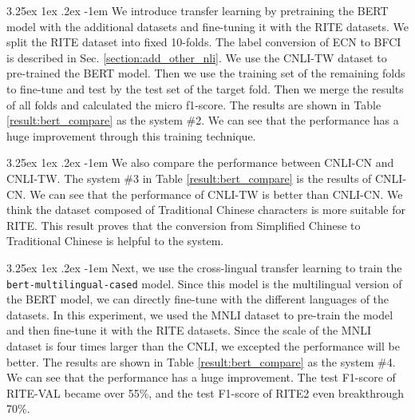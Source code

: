\documentclass[12pt]{article}
\makeatletter
\renewcommand\paragraph{\@startsection{paragraph}{5}{\z@}%
  {3.25ex \@plus1ex \@minus.2ex}%
  {-1em}%
  {\normalfont\normalsize\bfseries}}
\makeatother
\begin{document}
\begin{CJK*}{UTF8}{bkai}
\begin{spacing}{1.77}
\paragraph{}
We introduce transfer learning by pretraining the BERT model with the additional datasets and fine-tuning it with the RITE datasets. We split the RITE dataset into fixed 10-folds. The label conversion of ECN to BFCI is described in Sec. \ref{section:add_other_nli}. We use the CNLI-TW dataset to pre-trained the BERT model. Then we use the training set of the remaining folds to fine-tune and test by the test set of the target fold. Then we merge the results of all folds and calculated the micro f1-score. The results are shown in Table \ref{result:bert_compare} as the system \#2. We can see that the performance has a huge improvement through this training technique.

\paragraph{}
We also compare the performance between CNLI-CN and CNLI-TW. The system \#3 in Table \ref{result:bert_compare} is the results of CNLI-CN. We can see that the performance of CNLI-TW is better than CNLI-CN. We think the dataset composed of Traditional Chinese characters is more suitable for RITE. This result proves that the conversion from Simplified Chinese to Traditional Chinese is helpful to the system.

\paragraph{}
Next, we use the cross-lingual transfer learning to train the \texttt{bert-multilingual-cased} model. Since this model is the multilingual version of the BERT model, we can directly fine-tune with the different languages of the datasets. In this experiment, we used the MNLI dataset to pre-train the model and then fine-tune it with the RITE datasets. Since the scale of the MNLI dataset is four times larger than the CNLI, we excepted the performance will be better. The results are shown in Table \ref{result:bert_compare} as the system \#4. We can see that the performance has a huge improvement. The test F1-score of RITE-VAL became over 55\%, and the test F1-score of RITE2 even breakthrough 70\%.


\end{spacing}
\end{CJK*}
\end{document}
